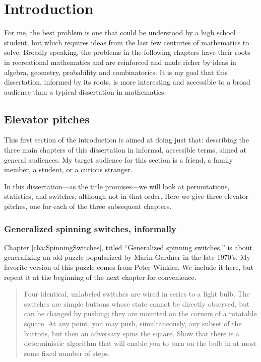 \chapter{Introduction}
\label{cha:introduction}

For me, the best problem is one that could be understood by a high school
student, but which requires ideas from the last few centuries of mathematics to
solve. Broadly speaking, the problems in the following chapters have their
roots in recreational mathematics and are reinforced and made richer by ideas
in algebra, geometry, probability and combinatorics.
It is my goal that this dissertation, informed by its roots, is more interesting
and accessible to a broad audience than a typical dissertation in mathematics.

\section{Elevator pitches}

This first section of the introduction is aimed at doing just that:
describing the three main chapters of this dissertation in informal, accessible
terms, aimed at general audiences.
My target audience for this section is a friend, a family member,
a student, or a curious stranger.

In this dissertation---as the title promises---we will look at
permutations, sta\-tis\-tics, and switch\-es, although not in that order. Here
we give three elevator pitches, one for each of the three subsequent chapters.

\subsection{Generalized spinning switches, informally}

Chapter \ref{cha:SpinningSwitches}, titled ``Generalized spinning switches,''
is about generalizing an old puzzle popularized by Marin Gardner in the late
1970's. My favorite version of this puzzle comes from Peter Winkler.
We include it here, but repeat it at the beginning of the next chapter for
convenience.

\begin{quote}
  Four identical, unlabeled switches are wired in series to a light bulb.
  The switches are simple buttons whose state cannot be directly observed,
  but can be changed by pushing; they are mounted on the corners of a
  rotatable square. At any point, you may push, simultaneously, any subset
  of the buttons, but then an adversary spins the square. Show that there
  is a deterministic algorithm that will enable you to turn on the bulb in
  at most some fixed number of steps. \cite{Winkler2004}
\end{quote}

